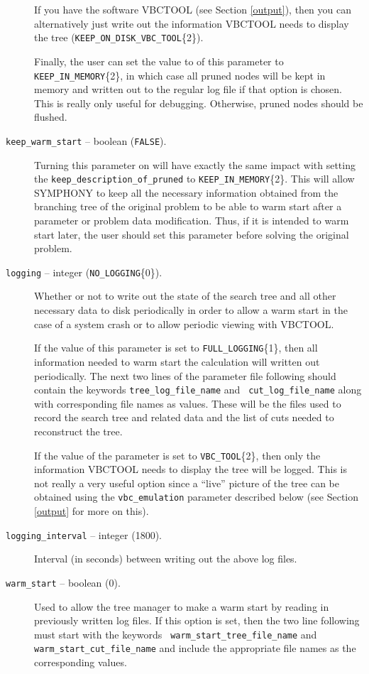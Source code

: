 \begin{description}
If you have the software VBCTOOL (see Section \ref{output}), then
you can alternatively just write out the information VBCTOOL needs to
display the tree ({\tt KEEP\_ON\_DISK\_VBC\_TOOL}\{2\}). 

Finally, the user can set the value to of this parameter to {\tt
KEEP\_IN\_MEMORY}\{2\}, in which case all pruned nodes will be kept in
memory and written out to the regular log file if that option is
chosen. This is really only useful for debugging. Otherwise, pruned
nodes should be flushed.

\item[{\tt keep\_warm\_start} -- boolean ({\tt FALSE}).] 
Turning this parameter on will have exactly the same impact with 
setting the {\tt keep\_description\_of\_pruned} to 
{\tt KEEP\_IN\_MEMORY}\{2\}. This will allow SYMPHONY to keep all the
necessary information obtained from the branching tree of the original 
problem to be able to warm start after a parameter or problem data 
modification. Thus, if it is intended to warm start later, the user 
should set this parameter before solving the original problem.
  
\item[{\tt logging} -- integer ({\tt NO\_LOGGING}\{0\}).]
Whether or not to write out the state of the search tree and all other
necessary data to disk periodically in order to allow a warm start in
the case of a system crash or to allow periodic viewing with VBCTOOL.

If the value of this parameter is set to {\tt FULL\_LOGGING}\{1\},
then all information needed to warm start the calculation will written
out periodically. The next two lines of the parameter file following
should contain the keywords {\tt tree\_log\_file\_name} and {\tt
cut\_log\_file\_name} along with corresponding file names as values.
These will be the files used to record the search tree and related
data and the list of cuts needed to reconstruct the tree.

If the value of the parameter is set to {\tt VBC\_TOOL}\{2\}, then
only the information VBCTOOL needs to display the tree will be
logged. This is not really a very useful option since a ``live'' picture
of the tree can be obtained using the {\tt vbc\_emulation} parameter
described below (see Section \ref{output} for more on this).

\item[{\tt logging\_interval} -- integer (1800).]
Interval (in seconds) between writing out the above log files.

\item[{\tt warm\_start} -- boolean (0).]
Used to allow the tree manager to make a warm start by reading in
previously written log files. If this option is set, then the two line
following must start with the keywords {\tt
warm\_start\_tree\_file\_name} and {\tt warm\_start\_cut\_file\_name}
and include the appropriate file names as the corresponding values.


\end{description}
